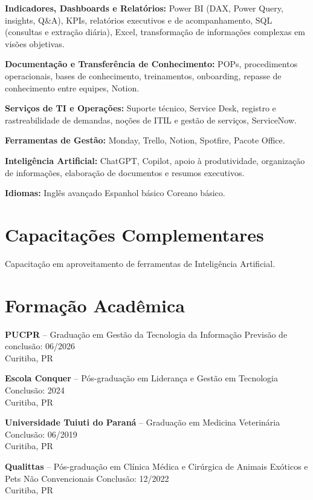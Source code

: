 \documentclass[11pt,a4paper]{article}
\begin{document}
\textbf{Indicadores, Dashboards e Relatórios:} Power BI (DAX, Power Query, insights, Q\&A), KPIs, relatórios executivos e de acompanhamento, SQL (consultas e extração diária), Excel, transformação de informações complexas em visões objetivas.

\textbf{Documentação e Transferência de Conhecimento:} POPs, procedimentos operacionais, bases de conhecimento, treinamentos, onboarding, repasse de conhecimento entre equipes, Notion.

\textbf{Serviços de TI e Operações:} Suporte técnico, Service Desk, registro e rastreabilidade de demandas, noções de ITIL e gestão de serviços, ServiceNow.

\textbf{Ferramentas de Gestão:} Monday, Trello, Notion, Spotfire, Pacote Office.

\textbf{Inteligência Artificial:} ChatGPT, Copilot, apoio à produtividade, organização de informações, elaboração de documentos e resumos executivos.

\textbf{Idiomas:} Inglês avançado \textbullet{} Espanhol básico \textbullet{} Coreano básico.

\section*{Capacitações Complementares}

Capacitação em aproveitamento de ferramentas de Inteligência Artificial.

\section*{Formação Acadêmica}

\textbf{PUCPR} -- Graduação em Gestão da Tecnologia da Informação \hfill Previsão de conclusão: 06/2026\\
Curitiba, PR

\textbf{Escola Conquer} -- Pós-graduação em Liderança e Gestão em Tecnologia \hfill Conclusão: 2024\\
Curitiba, PR

\textbf{Universidade Tuiuti do Paraná} -- Graduação em Medicina Veterinária \hfill Conclusão: 06/2019\\
Curitiba, PR

\textbf{Qualittas} -- Pós-graduação em Clínica Médica e Cirúrgica de Animais Exóticos e Pets Não Convencionais \hfill Conclusão: 12/2022\\
Curitiba, PR
\end{document}
